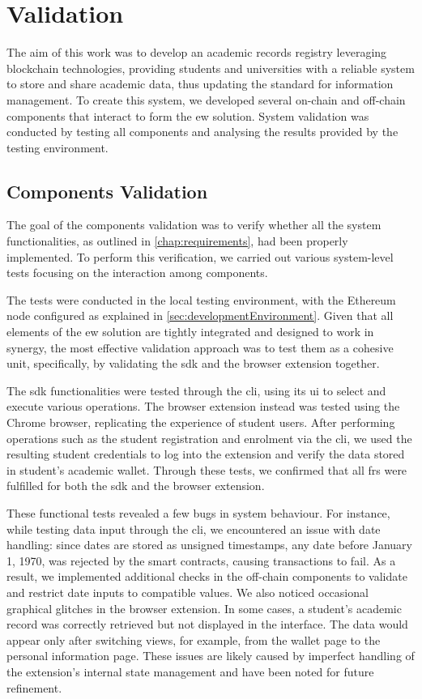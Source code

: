 \chapter{Validation}
\label{chap:validation}
The aim of this work was to develop an academic records registry leveraging blockchain technologies, providing students and universities with a reliable system to store and share academic data, thus updating the standard for information management. To create this system, we developed several on-chain and off-chain components that interact to form the \gls{ew} solution. System validation was conducted by testing all components and analysing the results provided by the testing environment.

\section{Components Validation}
The goal of the components validation was to verify whether all the system functionalities, as outlined in \cref{chap:requirements}, had been properly implemented. To perform this verification, we carried out various system-level tests focusing on the interaction among components.

The tests were conducted in the local testing environment, with the Ethereum node configured as explained in \cref{sec:developmentEnvironment}. Given that all elements of the \gls{ew} solution are tightly integrated and designed to work in synergy, the most effective validation approach was to test them as a cohesive unit, specifically, by validating the \gls{sdk} and the browser extension together.

The \gls{sdk} functionalities were tested through the \gls{cli}, using its \gls{ui} to select and execute various operations. The browser extension instead was tested using the Chrome browser, replicating the experience of student users. After performing operations such as the student registration and enrolment via the \gls{cli}, we used the resulting student credentials to log into the extension and verify the data stored in student's academic wallet. Through these tests, we confirmed that all \glspl{fr} were fulfilled for both the \gls{sdk} and the browser extension.

These functional tests revealed a few bugs in system behaviour. For instance, while testing data input through the \gls{cli}, we encountered an issue with date handling: since dates are stored as unsigned timestamps, any date before January 1, 1970, was rejected by the smart contracts, causing transactions to fail. As a result, we implemented additional checks in the off-chain components to validate and restrict date inputs to compatible values. We also noticed occasional graphical glitches in the browser extension. In some cases, a student’s academic record was correctly retrieved but not displayed in the interface. The data would appear only after switching views, for example, from the wallet page to the personal information page.  These issues are likely caused by imperfect handling of the extension’s internal state management and have been noted for future refinement.

